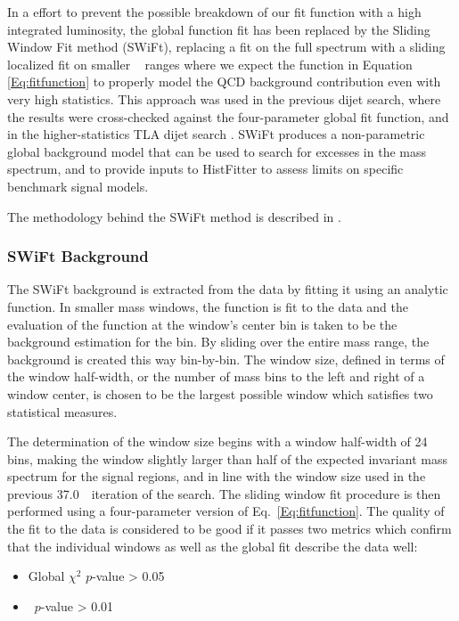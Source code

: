 In a effort to prevent the possible breakdown of our fit function with a high integrated luminosity, the global function fit has been replaced by the Sliding Window Fit method (SWiFt), replacing a fit on the full spectrum with a sliding localized fit on smaller \mjj~ ranges where we expect the function in Equation \ref{Eq:fitfunction} to properly model the QCD background contribution even with very high statistics.  This approach was used in the previous dijet search\cite{EXOT-2016-21}, where the results were cross-checked against the four-parameter global fit function, and in the higher-statistics TLA dijet search \cite{Nishu:2646455}.  SWiFt produces a non-parametric global background model that can be used to search for excesses in the mass spectrum, and to provide inputs to HistFitter to assess limits on specific benchmark signal models.

The methodology behind the SWiFt method is described in \cite{Sekhon:2305523}.

\subsubsection{SWiFt Background}
\label{sec:SwiftBkg}

The SWiFt background is extracted from the data by fitting it using an analytic function. In smaller mass windows, the function is fit to the data and the evaluation of the function at the window's center bin is taken to be the background estimation for the bin. By sliding over the entire mass range, the background is created this way bin-by-bin.  The window size, defined in terms of the window half-width, or the number of mass bins to the left and right of a window center, is chosen to be the largest possible window which satisfies two statistical measures.

The determination of the window size begins with a window half-width of 24 bins, making the window slightly larger than half of the expected invariant mass spectrum for the signal regions, and in line with the window size used in the previous 37.0~\ifb\ iteration of the search.  The sliding window fit procedure is then performed using a four-parameter version of Eq.~\ref{Eq:fitfunction}.  The quality of the fit to the data is considered to be good if it passes two metrics which confirm that the individual windows as well as the global fit describe the data well:

\begin{itemize}
	\item Global $\chi^2$ $p$-value > 0.05
	\item \BumpHunter\ $p$-value > 0.01
\end{itemize}

